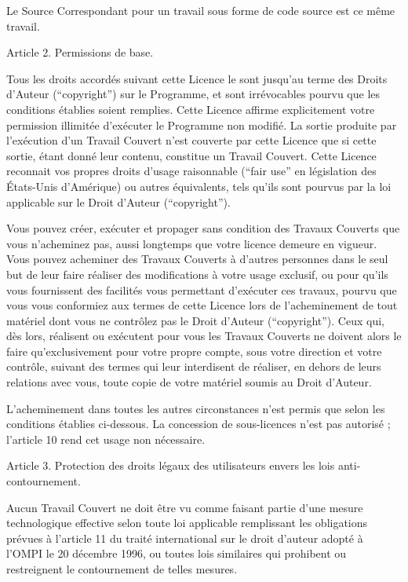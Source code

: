 {Le Source Correspondant pour un travail sous forme de code source est
ce même travail.

Article 2. Permissions de base.

Tous les droits accordés suivant cette Licence le sont jusqu’au terme
des Droits d’Auteur (“copyright”) sur le Programme, et sont
irrévocables pourvu que les conditions établies soient remplies. Cette
Licence affirme explicitement votre permission illimitée d’exécuter le
Programme non modifié. La sortie produite par l’exécution d’un Travail
Couvert n’est couverte par cette Licence que si cette sortie, étant
donné leur contenu, constitue un Travail Couvert. Cette Licence
reconnait vos propres droits d’usage raisonnable (“fair use” en
législation des États-Unis d’Amérique) ou autres équivalents, tels
qu’ils sont pourvus par la loi applicable sur le Droit d’Auteur
(“copyright”).

Vous pouvez créer, exécuter et propager sans condition des Travaux
Couverts que vous n’acheminez pas, aussi longtemps que votre licence
demeure en vigueur. Vous pouvez acheminer des Travaux Couverts à
d’autres personnes dans le seul but de leur faire réaliser des
modifications à votre usage exclusif, ou pour qu’ils vous fournissent
des facilités vous permettant d’exécuter ces travaux, pourvu que vous
vous conformiez aux termes de cette Licence lors de l’acheminement de
tout matériel dont vous ne contrôlez pas le Droit d’Auteur
(“copyright”). Ceux qui, dès lors, réalisent ou exécutent pour vous les
Travaux Couverts ne doivent alors le faire qu’exclusivement pour votre
propre compte, sous votre direction et votre contrôle, suivant des
termes qui leur interdisent de réaliser, en dehors de leurs relations
avec vous, toute copie de votre matériel soumis au Droit d’Auteur.

L’acheminement dans toutes les autres circonstances n’est permis que
selon les conditions établies ci-dessous. La concession de
sous-licences n’est pas autorisé ; l’article 10 rend cet usage non
nécessaire.


Article 3. Protection des droits légaux des utilisateurs envers les
lois anti-contournement.

Aucun Travail Couvert ne doit être vu comme faisant partie d’une mesure
technologique effective selon toute loi applicable remplissant les
obligations prévues à l’article 11 du traité international sur le droit
d’auteur adopté à l’OMPI le 20 décembre 1996, ou toutes lois similaires
qui prohibent ou restreignent le contournement de telles mesures.

}
